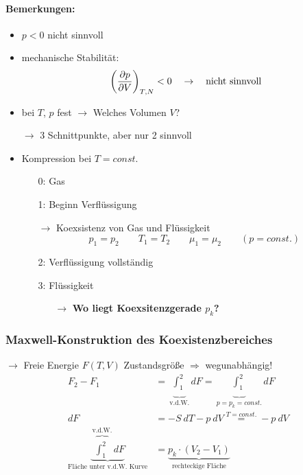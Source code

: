 \paragraph{Bemerkungen:}
\begin{itemize}
    \item $p < 0$ nicht sinnvoll
    \item mechanische Stabilität:
    \begin{align}
        \left(\pdv{p}{V}\right)_{T,N} < 0 \quad \rightarrow \quad \text{nicht sinnvoll}
    \end{align}
    \item bei $T$, $p$ fest $\rightarrow$ Welches Volumen $V$?
    \item[$\rightarrow$] 3 Schnittpunkte, aber nur 2 sinnvoll
    \item Kompression bei $T=const.$
    \begin{itemize}
        \item[0:] Gas 
        \item[1:] Beginn Verflüssigung
        \item[$\rightarrow$] Koexsistenz von Gas und Flüssigkeit
        \begin{equation}
            p_1 = p_2 \qquad T_1 = T_2 \qquad \mu_1 = \mu_2 \qquad (p=const.)
        \end{equation}
        \item[2:] Verflüssigung vollständig
        \item[3:] Flüssigkeit
        \begin{itemize}
            \item[$\longrightarrow$] \textbf{Wo liegt Koexsitenzgerade $p_k$?}
        \end{itemize}
         
    \end{itemize}
\end{itemize}


\subsubsection*{Maxwell-Konstruktion des Koexistenzbereiches}
$\rightarrow$ Freie Energie $F(T,V)$ Zustandsgröße $\Rightarrow$ wegunabhängig!
\begin{align}
    F_2-F_1 &= \underbrace{\int_1^2 \ }_{\text{v.d.W.}} dF = \underbrace{\int_1^2 \ }_{p=p_k=const.} dF \\
    dF &= -S \ dT - p \ dV \stackrel{T=const.}{=} -p \ dV \\
    \underbrace{\overbrace{\int_1^2 \ }^{\text{v.d.W.}} dF}_{\text{Fläche unter v.d.W. Kurve}} &= \underbrace{p_k \cdot (V_2-V_1)}_{\text{rechteckige Fläche}}
\end{align}

